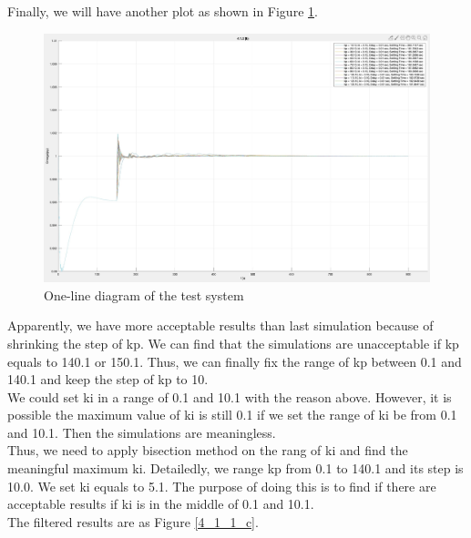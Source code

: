 \documentclass{report}
\begin{document}
Finally, we will have another plot as shown in Figure \textcolor{red}{\ref{4_1_1_b}}. \\

\begin{figure}[htbp]
\centering
\includegraphics[width = \textwidth]{figure/4_1_1_b.jpeg}
\caption{One-line diagram of the test system}
\label{4_1_1_b}
\end{figure}


Apparently, we have more acceptable results than last simulation because of shrinking the step of kp. We can find that the simulations are unacceptable if kp equals to 140.1 or 150.1. Thus, we can finally fix the range of kp between 0.1 and 140.1 and keep the step of kp to 10. \\

We could set ki in a range of 0.1 and 10.1 with the reason above. However, it is possible the maximum value of ki is still 0.1 if we set the range of ki be from 0.1 and 10.1. Then the simulations are meaningless. \\

Thus, we need to apply bisection method on the rang of ki and find the meaningful maximum ki. Detailedly, we range kp from 0.1 to 140.1 and its step is 10.0. We set ki equals to 5.1. The purpose of doing this is to find if there are acceptable results if ki is in the middle of 0.1 and 10.1.\\   

The filtered results are as Figure \textcolor{red}{\ref{4_1_1_c}}. \\
\end{document}
